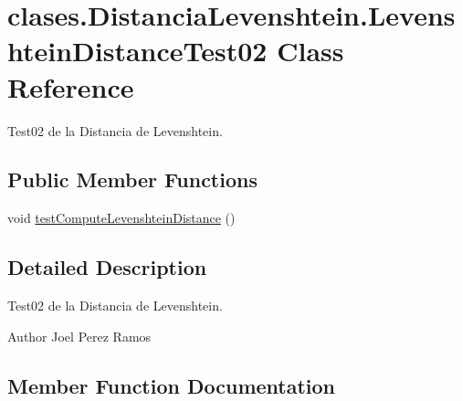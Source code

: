 \hypertarget{classclases_1_1_distancia_levenshtein_1_1_levenshtein_distance_test02}{}\section{clases.\+Distancia\+Levenshtein.\+Levenshtein\+Distance\+Test02 Class Reference}
\label{classclases_1_1_distancia_levenshtein_1_1_levenshtein_distance_test02}


Test02 de la Distancia de Levenshtein.  


\subsection*{Public Member Functions}
\begin{DoxyCompactItemize}
\item 
void \hyperlink{classclases_1_1_distancia_levenshtein_1_1_levenshtein_distance_test02_a0fb8d5113fa9cf3ce9f2378b06b3fdd7}{test\+Compute\+Levenshtein\+Distance} ()
\end{DoxyCompactItemize}


\subsection{Detailed Description}
Test02 de la Distancia de Levenshtein. 

\begin{DoxyAuthor}{Author}
Joel Perez Ramos 
\end{DoxyAuthor}


\subsection{Member Function Documentation}
\hypertarget{classclases_1_1_distancia_levenshtein_1_1_levenshtein_distance_test02_a0fb8d5113fa9cf3ce9f2378b06b3fdd7}{}\label{classclases_1_1_distancia_levenshtein_1_1_levenshtein_distance_test02_a0fb8d5113fa9cf3ce9f2378b06b3fdd7} 
